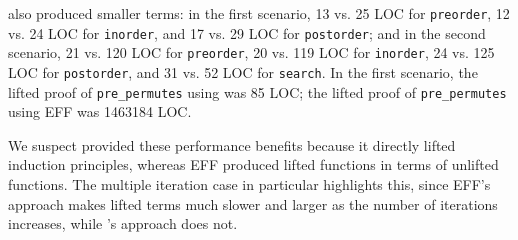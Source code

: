 \toolnameb also produced smaller terms:
in the first scenario, 13 vs. 25 LOC for \lstinline{preorder},
12 vs. 24 LOC for \lstinline{inorder}, and 17 vs. 29 LOC for \lstinline{postorder};
and in the second scenario, 21 vs. 120 LOC for \lstinline{preorder}, 20 vs. 119 LOC for \lstinline{inorder}, 
24 vs. 125 LOC for \lstinline{postorder}, and 31 vs. 52 LOC for \lstinline{search}.
In the first scenario, the lifted proof of \lstinline{pre_permutes} using \toolnameb was 85 LOC;
the lifted proof of \lstinline{pre_permutes} using EFF was 1463184 LOC.

We suspect \toolnameb provided these performance benefits because it directly
lifted induction principles, whereas EFF produced lifted functions in terms of unlifted functions. 
The multiple iteration case in particular highlights this,
since EFF's approach makes lifted terms much slower and larger as the number of iterations increases,
while \toolnameb's approach does not.

